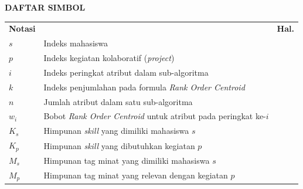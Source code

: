 \cleardoublepage
\vspace{2cm}
\begin{center}
{\fontsize{14}{16.8}\selectfont\textbf{DAFTAR SIMBOL}}\\[1em]
\end{center}
\label{chap:simbol}
\setcounter{chapter}{0}
\setcounter{section}{0}
\vspace{2em}

\begin{longtable}{@{} l >{\raggedright\arraybackslash}p{7cm} c @{}}
\multicolumn{1}{l}{\textbf{Notasi}} & \multicolumn{1}{l}{\textbf{Deskripsi}} & \multicolumn{1}{l}{\textbf{Hal.}} \\[0.5ex]

$s$                              & Indeks mahasiswa                                                              & \pageref{chap:perancangan} \\
$p$                              & Indeks kegiatan kolaboratif (\emph{project})                                  & \pageref{chap:perancangan} \\
$i$                              & Indeks peringkat atribut dalam sub-algoritma                                  & \pageref{chap:studi-literatur} \\
$k$                              & Indeks penjumlahan pada formula \emph{Rank Order Centroid}                    & \pageref{chap:studi-literatur} \\
$n$                              & Jumlah atribut dalam satu sub-algoritma                                       & \pageref{chap:studi-literatur} \\
$w_i$                            & Bobot \emph{Rank Order Centroid} untuk atribut pada peringkat ke-$i$          & \pageref{chap:studi-literatur} \\
$K_s$                            & Himpunan \emph{skill} yang dimiliki mahasiswa $s$                             & \pageref{chap:perancangan} \\
$K_p$                            & Himpunan \emph{skill} yang dibutuhkan kegiatan $p$                            & \pageref{chap:perancangan} \\
$M_s$                            & Himpunan tag minat yang dimiliki mahasiswa $s$                                & \pageref{chap:perancangan} \\
$M_p$                            & Himpunan tag minat yang relevan dengan kegiatan $p$                           & \pageref{chap:perancangan} \\

\end{longtable}
